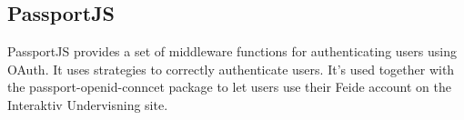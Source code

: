 \subsection{PassportJS}
PassportJS\cite{passportjs} provides a set of middleware functions for authenticating users using OAuth\cite{oauth}. It uses strategies to correctly authenticate users. It's used together with the passport-openid-conncet\cite{passportopenidconnect} package to let users use their Feide\cite{feide} account on the Interaktiv Undervisning site.



